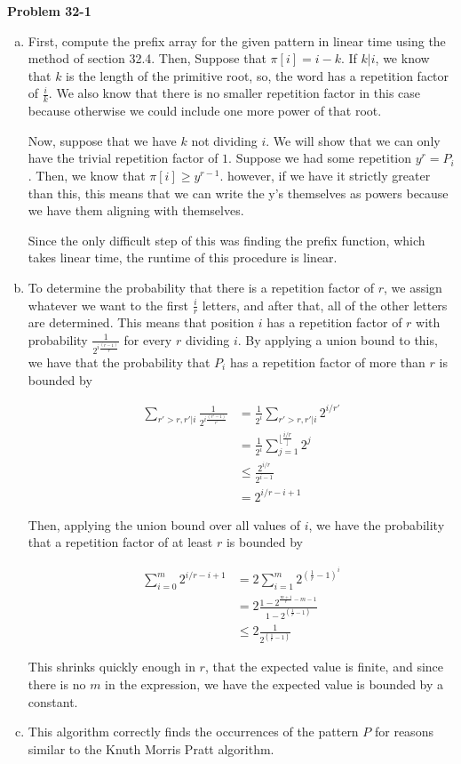 \documentclass{article}
\begin{document}
\noindent\textbf{Problem 32-1}\\
\begin{enumerate}[a.]
\item
First, compute the prefix array for the given pattern in linear time using the method of section 32.4. Then, Suppose that $\pi[i] = i-k$. If $k | i$, we know that $k$ is the length of the primitive root, so, the word has a repetition factor of $\frac{i}{k}$. We also know that there is no smaller repetition factor in this case because otherwise we could include one more power of that root.

Now, suppose that we have $k$ not dividing $i$. We will show that we can only have the trivial repetition factor of $1$. Suppose we had some repetition $y^r = P_i$. Then, we know that $\pi[i] \ge y^{r-1}$. however, if we have it strictly greater than this, this means that we can write the y's themselves as powers because we have them aligning with themselves.

Since the only difficult step of this was finding the prefix function, which takes linear time, the runtime of this procedure is linear.
\item
To determine the probability that there is a repetition factor of $r$, we assign whatever we want to the first $\frac{i}{r}$ letters, and after that, all of the other letters are determined. This means that position $i$ has a repetition factor of $r$ with probability $\frac{1}{2^{i\frac{(r-1)}{r}}}$ for every $r$ dividing $i$. By applying a union bound to this, we have that the probability that $P_i$ has a repetition factor of more than $r$ is bounded by

\begin{align*}
\sum_{r'>r, r'|i} \frac{1}{2^{i\frac{(r'-1)}{r'}}}& = \frac{1}{2^i}\sum_{r'>r, r' |i}2^{i/r'}\\
&= \frac{1}{2^i} \sum_{j=1}^{\lfloor\frac{i/r}\rfloor}2^{j}\\
&\le \frac{2^{i/r}}{2^{i-1}}\\
&=2^{i/r -i +1}
\end{align*}

Then, applying the union bound over all values of $i$, we have the probability that a repetition factor of at least $r$ is bounded by

\begin{align*}
\sum_{i=0}^m 2^{i/r -i +1}& = 2 \sum_{i=1}^m 2^{(\frac{1}{r}-1)^i } \\
&= 2\frac{1-2^{\frac{m+1}{r}-m-1}}{1 - 2^{(\frac{1}{r}-1)}}\\
&\le 2\frac{1}{2^{(\frac{1}{r}-1)}}
\end{align*}

This shrinks quickly enough in $r$, that the expected value is finite, and since there is no $m$ in the expression, we have the expected value is bounded by a constant.
\item
This algorithm correctly finds the occurrences of the pattern $P$ for reasons similar to the Knuth Morris Pratt algorithm.
\end{enumerate}
\end{document}
